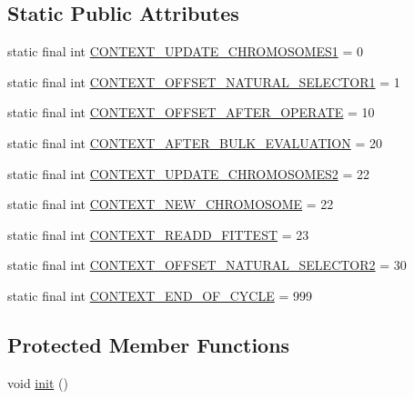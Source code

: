 \subsection*{Static Public Attributes}
\begin{DoxyCompactItemize}
\item 
static final int \hyperlink{classorg_1_1jgap_1_1audit_1_1_evolution_monitor_a381ca4cf44eb3d5a1fe997c16a25a64b}{C\-O\-N\-T\-E\-X\-T\-\_\-\-U\-P\-D\-A\-T\-E\-\_\-\-C\-H\-R\-O\-M\-O\-S\-O\-M\-E\-S1} = 0
\item 
static final int \hyperlink{classorg_1_1jgap_1_1audit_1_1_evolution_monitor_a18eaee603059528ce6566d24f8ab276a}{C\-O\-N\-T\-E\-X\-T\-\_\-\-O\-F\-F\-S\-E\-T\-\_\-\-N\-A\-T\-U\-R\-A\-L\-\_\-\-S\-E\-L\-E\-C\-T\-O\-R1} = 1
\item 
static final int \hyperlink{classorg_1_1jgap_1_1audit_1_1_evolution_monitor_a6ce6f389d420081290b2515d661cb4c0}{C\-O\-N\-T\-E\-X\-T\-\_\-\-O\-F\-F\-S\-E\-T\-\_\-\-A\-F\-T\-E\-R\-\_\-\-O\-P\-E\-R\-A\-T\-E} = 10
\item 
static final int \hyperlink{classorg_1_1jgap_1_1audit_1_1_evolution_monitor_a77402b10c3318b6bc1cff7b98eb193a3}{C\-O\-N\-T\-E\-X\-T\-\_\-\-A\-F\-T\-E\-R\-\_\-\-B\-U\-L\-K\-\_\-\-E\-V\-A\-L\-U\-A\-T\-I\-O\-N} = 20
\item 
static final int \hyperlink{classorg_1_1jgap_1_1audit_1_1_evolution_monitor_abed0b9acfd069cd676575e6d3922e5ba}{C\-O\-N\-T\-E\-X\-T\-\_\-\-U\-P\-D\-A\-T\-E\-\_\-\-C\-H\-R\-O\-M\-O\-S\-O\-M\-E\-S2} = 22
\item 
static final int \hyperlink{classorg_1_1jgap_1_1audit_1_1_evolution_monitor_a05835f8659f5d78f66d08b197f1edcb0}{C\-O\-N\-T\-E\-X\-T\-\_\-\-N\-E\-W\-\_\-\-C\-H\-R\-O\-M\-O\-S\-O\-M\-E} = 22
\item 
static final int \hyperlink{classorg_1_1jgap_1_1audit_1_1_evolution_monitor_a48ecef07f3b676117f73f38ba48381cd}{C\-O\-N\-T\-E\-X\-T\-\_\-\-R\-E\-A\-D\-D\-\_\-\-F\-I\-T\-T\-E\-S\-T} = 23
\item 
static final int \hyperlink{classorg_1_1jgap_1_1audit_1_1_evolution_monitor_ae72fa4d283a303569b89657fa232968c}{C\-O\-N\-T\-E\-X\-T\-\_\-\-O\-F\-F\-S\-E\-T\-\_\-\-N\-A\-T\-U\-R\-A\-L\-\_\-\-S\-E\-L\-E\-C\-T\-O\-R2} = 30
\item 
static final int \hyperlink{classorg_1_1jgap_1_1audit_1_1_evolution_monitor_a62e859e46b419081b3cab290da4cba45}{C\-O\-N\-T\-E\-X\-T\-\_\-\-E\-N\-D\-\_\-\-O\-F\-\_\-\-C\-Y\-C\-L\-E} = 999
\end{DoxyCompactItemize}
\subsection*{Protected Member Functions}
\begin{DoxyCompactItemize}
\item 
void \hyperlink{classorg_1_1jgap_1_1audit_1_1_evolution_monitor_a0bcc69c26e4b793ed68dc4e3c410a455}{init} ()
\end{DoxyCompactItemize}
